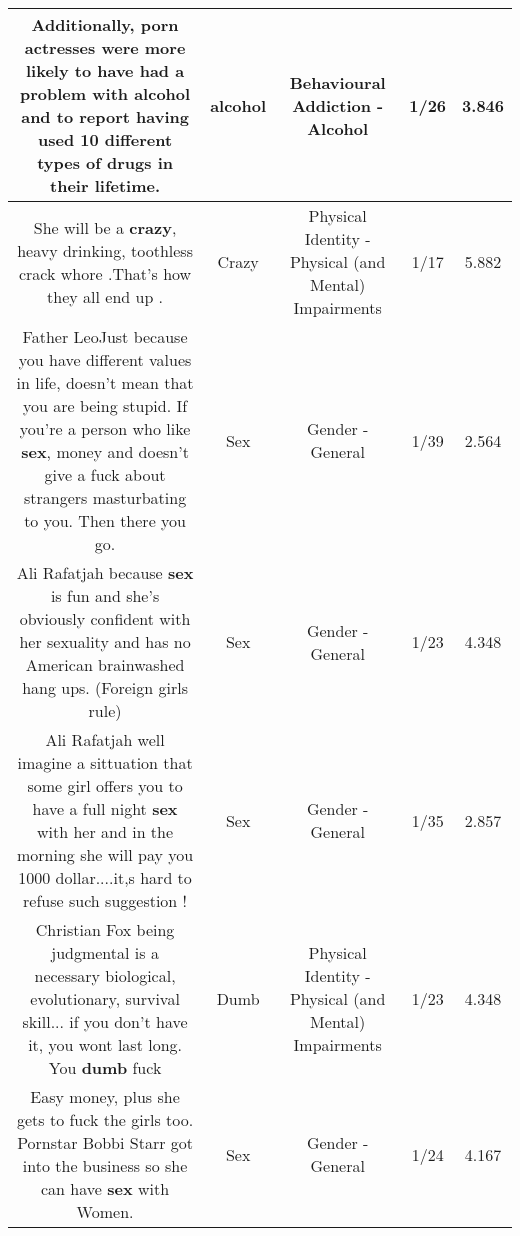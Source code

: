 \documentclass[11pt]{article}
\newlength\mylength
\begin{document}
\begin{center}
\begin{longtable}{|C{.65\mylength}|C{.30\mylength}|C{.12\mylength}|C{.12\mylength}|C{.12\mylength}|}
  \small Additionally, porn actresses were more likely to have had a problem with \textbf{alcohol} and to report having used 10 different types of drugs in their lifetime.\normalsize   & alcohol & Behavioural Addiction - Alcohol & 1/26 & 3.846 \\  \hline
  \small She will be a \textbf{crazy}, heavy drinking, toothless crack whore .That's how they all end up .\normalsize   & Crazy & Physical Identity - Physical (and Mental) Impairments & 1/17 & 5.882 \\  \hline
  \small Father LeoJust because you have different values in life, doesn't mean that you are being stupid. If you're a person who like \textbf{sex}, money and doesn't give a fuck about strangers masturbating to you. Then there you go.\normalsize   & Sex & Gender - General & 1/39 & 2.564 \\  \hline
  \small Ali Rafatjah because \textbf{sex} is fun and she's obviously confident with her sexuality and has no American brainwashed hang ups. (Foreign girls rule)\normalsize   & Sex & Gender - General & 1/23 & 4.348 \\  \hline
  \small Ali Rafatjah well imagine a sittuation that some girl offers you to have a full night \textbf{sex} with her and in the morning she will pay you 1000 dollar....it,s hard to refuse such suggestion !\normalsize   & Sex & Gender - General & 1/35 & 2.857 \\  \hline
  \small Christian Fox being judgmental is a necessary biological, evolutionary, survival skill... if you don't have it, you wont last long. You \textbf{dumb} fuck\normalsize   & Dumb & Physical Identity - Physical (and Mental) Impairments & 1/23 & 4.348 \\  \hline
  \small Easy money, plus she gets to fuck the girls too. Pornstar Bobbi Starr got into the business so she can have \textbf{sex} with Women.\normalsize   & Sex & Gender - General & 1/24 & 4.167 \\  \hline

\end{longtable}
\end{center}
\end{document}
